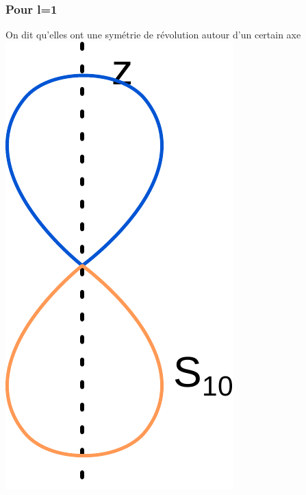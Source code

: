 \documentclass[french]{yLectureNote}
\begin{document}
\subsubsection{Pour l=1}
On dit qu'elles ont une symétrie de révolution autour d'un certain axe
\includegraphics[scale=0.5]{s10}
\end{document}
